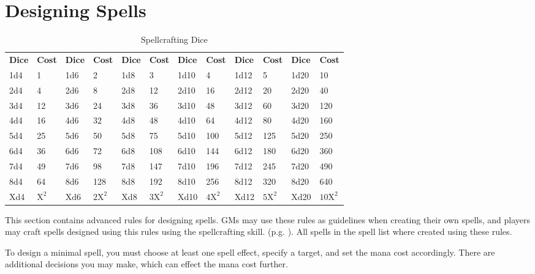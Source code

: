 \section{Designing Spells}

\begin{table}[ht]
    \unclassedrowcolors
    \begin{tabularx}{\textwidth}{l X l X l X l X l X l X}
        \textbf{Dice} & \textbf{Cost} & \textbf{Dice} & \textbf{Cost} & \textbf{Dice} & \textbf{Cost} & \textbf{Dice} & \textbf{Cost} & \textbf{Dice} & \textbf{Cost} & \textbf{Dice} & \textbf{Cost} \\
        1d4 & 1   & 1d6 & 2    & 1d8 & 3    & 1d10 & 4    & 1d12 & 5    & 1d20 & 10    \\
        2d4 & 4   & 2d6 & 8    & 2d8 & 12   & 2d10 & 16   & 2d12 & 20   & 2d20 & 40    \\
        3d4 & 12  & 3d6 & 24   & 3d8 & 36   & 3d10 & 48   & 3d12 & 60   & 3d20 & 120   \\
        4d4 & 16  & 4d6 & 32   & 4d8 & 48   & 4d10 & 64   & 4d12 & 80   & 4d20 & 160   \\
        5d4 & 25  & 5d6 & 50   & 5d8 & 75   & 5d10 & 100  & 5d12 & 125  & 5d20 & 250   \\
        6d4 & 36  & 6d6 & 72   & 6d8 & 108  & 6d10 & 144  & 6d12 & 180  & 6d20 & 360   \\
        7d4 & 49  & 7d6 & 98   & 7d8 & 147  & 7d10 & 196  & 7d12 & 245  & 7d20 & 490   \\
        8d4 & 64  & 8d6 & 128  & 8d8 & 192  & 8d10 & 256  & 8d12 & 320  & 8d20 & 640   \\
        Xd4 & $\text{X}^\text{2}$ & Xd6 & $\text{2X}^\text{2}$ & Xd8 & $\text{3X}^\text{2}$ & Xd10 & $\text{4X}^\text{2}$ & Xd12 & $\text{5X}^\text{2}$ & Xd20 & $\text{10X}^\text{2}$ \\
    \end{tabularx}
    \caption{Spellcrafting Dice}
    \label{tab:spellcrafting-dice}
\end{table}

This section contains advanced rules for designing spells. GMs may use these
rules as guidelines when creating their own spells, and players may craft
spells designed using this rules using the spellcrafting skill. (p.g.
\pageref{skill:spellcrafting}). All spells in the spell list where
created using these rules.

To design a minimal spell, you must choose at least one spell effect, specify
a target, and set the mana cost accordingly. There are additional decisions
you may make, which can effect the mana cost further.

